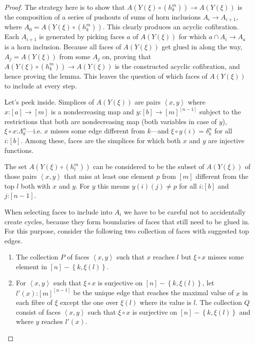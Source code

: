 \documentclass{tac}
\newcommand\of{\mathord:}
\newcommand\set[1]{\left\{#1\right\}}
\newcommand\tuplet[1]{\left\langle{} #1 \right\rangle}
\begin{document}
\begin{proof}
  The strategy here is to show that \( A(Y(\xi)\circ(h^m_k))\to A(Y(\xi)) \) 
  is the composition of a series of pushouts of sums of horn inclusions \(
    A_i\to A_{i+1} \), where \( A_0 = A(Y(\xi)\circ(h^m_k)) \).
  This clearly produces an acyclic cofibration.
  Each \(A_{i+1}\) is generated by picking faces \(a\) of \(A(Y(\xi))\) for 
  which \(a\cap A_i\to A_a\) is a horn inclusion. Because all faces of 
  \(A(Y(\xi))\) get glued in along the way, \(A_j=A(Y(\xi))\) from some 
  \(A_j\) on, proving that  \( A(Y(\xi)\circ(h^m_k))\to A(Y(\xi)) \) is the
  constructed acyclic cofibration, and hence proving the lemma.
  This leaves the question of which faces of  \(A(Y(\xi))\) to include at every 
  step.
  
  Let's peek inside. Simplices of \( A(Y(\xi)) \) are pairs \(\tuplet{x,y}\)
  where \(x\of[a]\to [m]\) is a nondecreasing map and \(
    y\of [b]\to{[m]}^{[n-1]}\) subject to the restrictions that both are 
  nondecreasing map (both variables in case of \(y\)), \(
    \xi\circ x\of \Lambda^n_k\)---i.e. \(x\) misses some edge different from 
  \(k\)---and \(\xi\circ y(i) = \delta^n_k \) for all \( i\of [b] \). Among 
  these, faces are the simplices for which both \(x\) and \(y\) are injective 
  functions.

  The set \( A(Y(\xi)\circ(h^m_l)) \) can be considered to be the subset of 
  \( A(Y(\xi)) \) of those pairs \(\tuplet{x,y}\) that miss at least one element
  \(p\) from \([m]\) different from the top \(l\) both with \(x\) and \(y\). 
  For \(y\) this means \(y(i)(j)\neq p\) for all \(i\of[b]\) and \(j\of[n-1]\).

  When selecting faces to include into \(A_i\) we have to be careful not to
  accidentally create cycles, because they form boundaries of faces that
  still need to be glued in. For this purpose, consider the following two
  collection of faces with suggested top edges.
  \begin{enumerate}
    \item The collection \(P\) of faces \( \tuplet{x,y} \) such that \( x \) 
    reaches \(l\) but \(\xi\circ x\) misses some element in 
    \([n]-\set{k,\xi(l)}\).
    \item For \( \tuplet{x,y} \) such that 
    \( \xi\circ x \) is surjective on \([n]-\set{k,\xi(l)}\), 
    let \(l'(x)\of {[m]}^{[n-1]}\) be the unique edge that reaches 
    the maximal value of \(x\) in each fibre of \(\xi \) except the one over
    \(\xi(l)\) where its value is \(l\).
    The collection \(Q\) consist of faces \( \tuplet{x,y} \) such that 
    \( \xi\circ x \) is surjective on \([n]-\set{k,\xi(l)}\)
    and where \(y\) reaches \(l'(x)\).
  \end{enumerate}


\end{proof}
\end{document}
